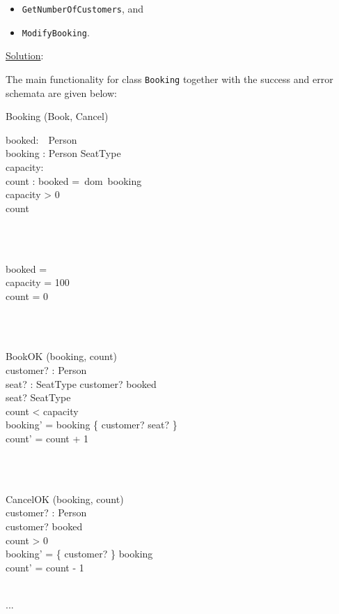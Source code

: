 \documentclass[12pt]{article}
\begin{document}
\begin{itemize}

\item \texttt{GetNumberOfCustomers}, and
\item \texttt{ModifyBooking}.

\end{itemize}

\newpage

\noindent \underline{Solution}:

\noindent The main functionality for class \texttt{Booking} together with the success and error schemata are given below:

\begin{class}{Booking}
\also
\upharpoonright (Book, Cancel) \\
\begin{state}
booked:~~Person\\
booking : Person \pinj SeatType\\
capacity: \\
count : 
\where
booked =~dom~booking\\
capacity > 0\\
count 
\end{state} \\
\ \\
\begin{init}
booked = \emptyset \\
capacity = 100\\
count = 0
\end{init} \\
\ \\
\begin{op}{BookOK}
\Delta (booking, count) \\
customer? : Person\\
seat? : SeatType
\ST
customer? \notin booked\\
seat? \notin \ran SeatType\\
count < capacity\\
booking' = booking \cup \{ customer? \mapsto seat? \}\\
count' = count + 1
\end{op}\\
\ \\
\begin{op}{CancelOK}
\Delta (booking, count) \\
customer? : Person\\
\ST
customer? \in booked\\
count > 0\\
booking' = \{ customer? \} \ndres booking\\
count' = count - 1
\end{op}\\
...\\
\end{class}
\end{document}
